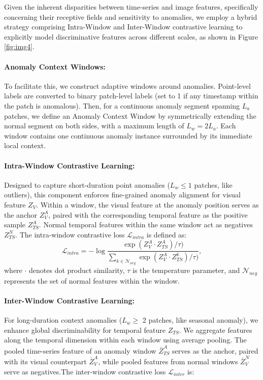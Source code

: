 \documentclass{article}
\theoremstyle{plain}
\theoremstyle{definition}
\theoremstyle{remark}
\begin{document}
Given the inherent disparities between time-series and image features, specifically concerning their receptive fields and sensitivity to anomalies, we employ a hybrid strategy comprising Intra-Window and Inter-Window contrastive learning to explicitly model discriminative features across different scales, as shown in Figure \ref{fig:img4}.
\vspace{-0.5em}
\paragraph{Anomaly Context Windows:}
To facilitate this, we construct adaptive windows around anomalies. Point-level labels are converted to binary patch-level labels (set to 1 if any timestamp within the patch is anomalous). Then, for a continuous anomaly segment spanning $L_a$ patches, we define an Anomaly Context Window by symmetrically extending the normal segment on both sides, with a maximum length of $L_w = 2 L_a$. Each window contains one continuous anomaly instance surrounded by its immediate local context.
\vspace{-0.5em}
\paragraph{Intra-Window Contrastive Learning:}
Designed to capture short-duration point anomalies ($L_w \le 1$ patches, like outliers), this component enforces fine-grained anomaly alignment for visual feature  $Z_{V}$. Within a window, the visual feature at the anomaly position serves as the anchor $Z_{V}^{A}$, paired with the corresponding temporal feature as the positive sample $Z_{TS}^{A}$. Normal temporal features within the same window act as negatives $Z_{TS}^{N}$. The intra-window contrastive loss $\mathcal{L}_{intra}$ is defined as:
\begin{equation}
\mathcal{L}_{intra} = - \log \frac{\exp(Z_{V}^{A} \cdot Z_{TS}^{A})/\tau)}{\sum_{k \in \mathcal{N}_{neg}} \exp(Z_{V}^{A}\cdot Z_{TS}^{k})/\tau)},
\end{equation}
where $\cdot$ denotes dot product similarity, $\tau$ is the temperature parameter, and $\mathcal{N}_{neg}$ represents the set of normal features within the window.
\vspace{-0.5em}
\paragraph{Inter-Window Contrastive Learning:}
For long-duration context anomalies ($L_w \ge$ 2  patches, like seasonal anomaly), we enhance global discriminability for temporal feature  $Z_{TS}$. We aggregate features along the temporal dimension within each window using average pooling. The pooled time-series feature of an anomaly window $\bar{Z}_{TS}^{A}$ serves as the anchor, paired with its visual counterpart $\bar{Z}_{V}^{A}$, while pooled features from normal windows $\bar{Z}_{V}^{N}$ serve as negatives.The inter-window contrastive loss $\mathcal{L}_{inter}$ is:
\end{document}
